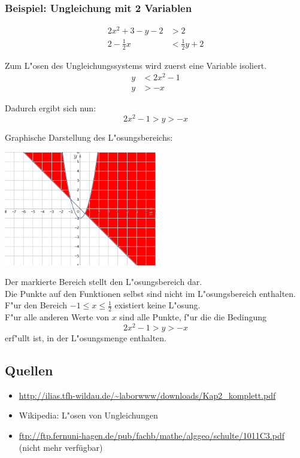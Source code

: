 \subsubsection{Beispiel: Ungleichung mit 2 Variablen}

\begin{align*}
2x^2 + 3 - y - 2 &> 2 \\
2 - \frac{1}{2} x &< \frac{1}{2} y + 2
\end{align*}

Zum L"osen des Ungleichungssystems wird zuerst eine Variable isoliert.
\begin{align*}
y &< 2x^2 - 1 \\
y &> -x
\end{align*}

Dadurch ergibt sich nun:
\[ 2x^2 - 1 > y > -x \]

Graphische Darstellung des L"osungsbereichs:
\begin{center}
\includegraphics[width=0.5\textwidth]{img/ungleichungen/UGlsystmit2.png}
\end{center}

Der markierte Bereich stellt den L"osungsbereich dar. \\
Die Punkte auf den Funktionen selbst sind nicht im L"osungsbereich enthalten. \\
F"ur den Bereich $ -1 \leq x \leq \frac{1}{2} $ existiert keine L"osung. \\
F"ur alle anderen Werte von $x$ sind alle Punkte, f"ur die die Bedingung
\[ 2x^2 - 1 > y > -x \] erf"ullt ist, in der L"osungsmenge enthalten.

\subsection{Quellen}
\small
\begin{itemize}
\item{\url{http://ilias.tfh-wildau.de/~laborwww/downloads/Kap2_komplett.pdf}}
\item{Wikipedia: L"osen von Ungleichungen}
\item{\url{ftp://ftp.fernuni-hagen.de/pub/fachb/mathe/alggeo/schulte/1011C3.pdf} \linebreak (nicht mehr verfügbar)}
\end{itemize}
\normalsize

